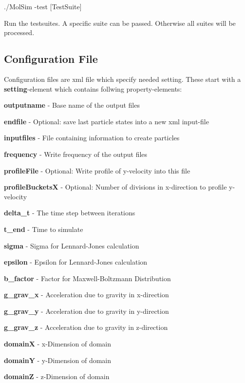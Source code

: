 \begin{DoxyCode}
./MolSim -test [TestSuite]
\end{DoxyCode}
 Run the testsuites. A specific suite can be passed. Otherwise all suites will be processed.\hypertarget{index_cfile_ssec}{}\subsection{Configuration File}\label{index_cfile_ssec}
Configuration files are xml file which specify needed setting. These start with a {\bfseries setting}-\/element which contains follwing property-\/elements\+:
\begin{DoxyItemize}
\item {\bfseries outputname} -\/ Base name of the output files
\item {\bfseries endfile} -\/ Optional\+: save last particle states into a new xml input-\/file
\item {\bfseries inputfiles} -\/ File containing information to create particles
\item {\bfseries frequency} -\/ Write frequency of the output files
\item {\bfseries profile\+File} -\/ Optional\+: Write profile of y-\/velocity into this file
\item {\bfseries profile\+BucketsX} -\/ Optional\+: Number of divisions in x-\/direction to profile y-\/velocity
\item {\bfseries delta\+\_\+t} -\/ The time step between iterations
\item {\bfseries t\+\_\+end} -\/ Time to simulate
\item {\bfseries sigma} -\/ Sigma for Lennard-\/\+Jones calculation
\item {\bfseries epsilon} -\/ Epsilon for Lennard-\/\+Jones calculation
\item {\bfseries b\+\_\+factor} -\/ Factor for Maxwell-\/\+Boltzmann Distribution
\item {\bfseries g\+\_\+grav\+\_\+x} -\/ Acceleration due to gravity in x-\/direction
\item {\bfseries g\+\_\+grav\+\_\+y} -\/ Acceleration due to gravity in y-\/direction
\item {\bfseries g\+\_\+grav\+\_\+z} -\/ Acceleration due to gravity in z-\/direction
\item {\bfseries domainX} -\/ x-\/\+Dimension of domain
\item {\bfseries domainY} -\/ y-\/\+Dimension of domain
\item {\bfseries domainZ} -\/ z-\/\+Dimension of domain

\end{DoxyItemize}
